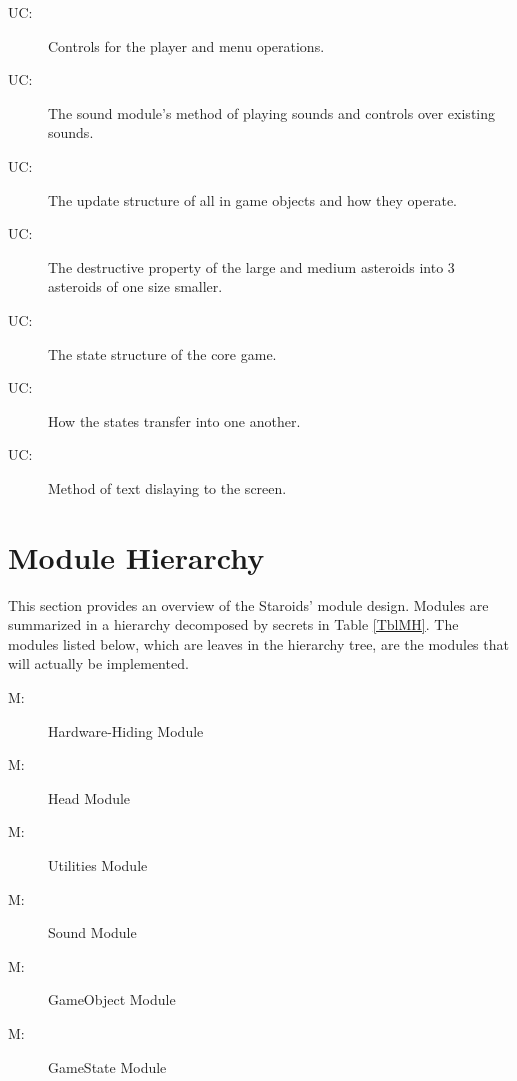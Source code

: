 \documentclass[12pt, titlepage]{article}
\newcounter{ucnum}
\newcommand{\uctheucnum}{UC\theucnum}
\newcounter{mnum}
\newcommand{\mthemnum}{M\themnum}
\begin{document}
\begin{description}
\item[ \uctheucnum \label{ucUtilities}:] Controls for the player and menu operations.
\item[ \uctheucnum \label{ucSound}:] The sound module's method of playing sounds and controls over existing sounds.
\item[ \uctheucnum \label{ucGameobject}:] The update structure of all in game objects and how they operate.
\item[ \uctheucnum \label{ucGameobject}:] The destructive property of the large and medium asteroids into 3 asteroids of one size smaller.
\item[ \uctheucnum \label{ucGamestate}:] The state structure of the core game.
\item[ \uctheucnum \label{ucGamestate}:] How the states transfer into one another.
\item[ \uctheucnum \label{ucGamestate}:] Method of text dislaying to the screen.
\end{description}

\section{Module Hierarchy} \label{SecMH}

This section provides an overview of the Staroids' module design. Modules are summarized
in a hierarchy decomposed by secrets in Table \ref{TblMH}. The modules listed
below, which are leaves in the hierarchy tree, are the modules that will
actually be implemented.

\begin{description}
\item [ \mthemnum \label{mHH}:] Hardware-Hiding Module
\item [ \mthemnum \label{mBHa}:] Head Module
\item [ \mthemnum \label{mBHu}:] Utilities Module
\item [ \mthemnum \label{mBHs}:] Sound Module
\item [ \mthemnum \label{mSDgo}:] GameObject Module
\item [ \mthemnum \label{mSDgs}:] GameState Module
\end{description}
\end{document}
